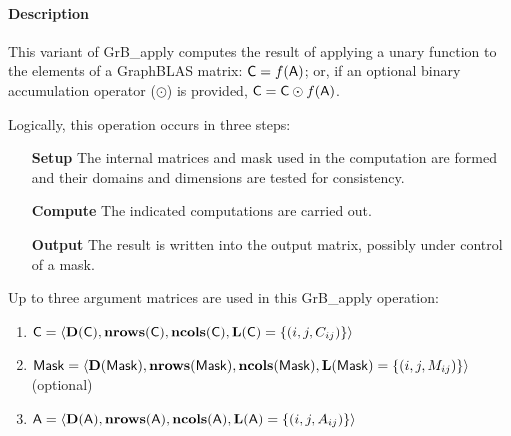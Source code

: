 \paragraph{Description}

This variant of {\sf GrB\_apply} computes the result of applying a unary function
to the elements of a 
GraphBLAS matrix: ${\sf C} = f({\sf A})$; or, if an 
optional binary accumulation operator ($\odot$) is provided, 
${\sf C} = {\sf C} \odot f({\sf A})$.  

Logically, this operation occurs in three steps:
\begin{enumerate}[leftmargin=0.75in]
\item[\bf Setup] The internal matrices and mask used in the computation are formed 
and their domains and dimensions are tested for consistency.
\item[\bf Compute] The indicated computations are carried out.
\item[\bf Output] The result is written into the output matrix, possibly under 
control of a mask.
\end{enumerate}

Up to three argument matrices are used in this {\sf GrB\_apply} operation:
\begin{enumerate}
	\item ${\sf C} = \langle \bold{D}({\sf C}),\bold{nrows}({\sf C}),
    \bold{ncols}({\sf C}),\bold{L}({\sf C}) = \{(i,j,C_{ij}) \} \rangle$
    
	\item ${\sf Mask} = \langle \bold{D}({\sf Mask}),\bold{nrows}({\sf Mask}),
    \bold{ncols}({\sf Mask}),\bold{L}({\sf Mask}) = \{(i,j,M_{ij}) \} \rangle$ (optional)

	\item ${\sf A} = \langle \bold{D}({\sf A}),\bold{nrows}({\sf A}),
    \bold{ncols}({\sf A}),\bold{L}({\sf A}) = \{(i,j,A_{ij}) \} \rangle$
\end{enumerate}

